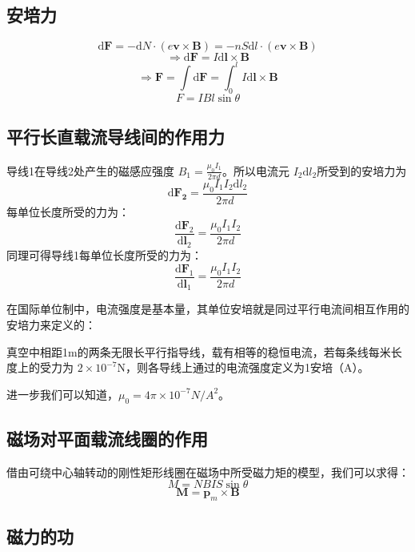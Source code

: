\subsection{安培力}

$$
\mathrm{d}\boldsymbol{F}=-\mathrm{d}N\cdot (e \boldsymbol{v} \times \boldsymbol{B})=-nS\mathrm{d}l\cdot (e \boldsymbol{v}\times \boldsymbol{B})
$$
$$
\Rightarrow \mathrm{d}\boldsymbol{F}=I\mathrm{d}\boldsymbol{l}\times \boldsymbol{B}
$$
$$
\Rightarrow \boldsymbol{F}=\int \mathrm{d} \boldsymbol{F}=\int_{0}^{l}I\mathrm{d}\boldsymbol{l}\times \boldsymbol{B}
$$
$$
F=IBl\sin \theta
$$

\subsection{平行长直载流导线间的作用力}

导线1在导线2处产生的磁感应强度 $B_1=\displaystyle \frac{\mu_0I_1}{2\pi d}$。所以电流元 $I_2\mathrm{d}l_2$所受到的安培力为
$$
\mathrm{d}\boldsymbol{F_2}=\frac{\mu_0I_1I_2\mathrm{d}l_2}{2\pi d}
$$
每单位长度所受的力为：
$$
\frac{\mathrm{d}\boldsymbol{F}_2}{\mathrm{d}\boldsymbol{l}_{2}}=\frac{\mu_0I_1I_2}{2\pi d}
$$
同理可得导线1每单位长度所受的力为：
$$
\frac{\mathrm{d}\boldsymbol{F}_1}{\mathrm{d}\boldsymbol{l}_{1}}=\frac{\mu_0I_1I_2}{2\pi d}
$$

在国际单位制中，电流强度是基本量，其单位安培就是同过平行电流间相互作用的安培力来定义的：

{
  \kaishu
  真空中相距1m的两条无限长平行指导线，载有相等的稳恒电流，若每条线每米长度上的受力为 $2\times 10^{-7}\mathrm{N}$，则各导线上通过的电流强度定义为1安培（A）。
}

进一步我们可以知道，$\mu_0=4\pi \times 10^{-7}N/A^{2}$。

\subsection{磁场对平面载流线圈的作用}

借由可绕中心轴转动的刚性矩形线圈在磁场中所受磁力矩的模型，我们可以求得：
\begin{equation}
  \label{clj-scalar}
  M=NBIS\sin \theta
\end{equation}
\begin{equation}
  \label{clj-vector}
  \boldsymbol{M}=\boldsymbol{p}_{m}\times \boldsymbol{B}
\end{equation}

\subsection{磁力的功}

